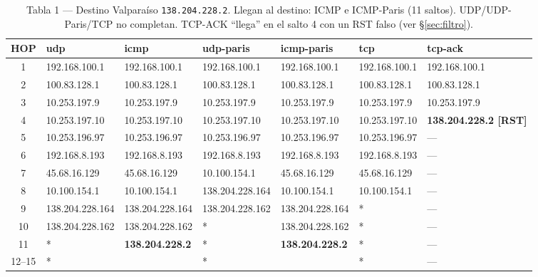 \documentclass[11pt,a4paper]{article}
\newcommand{\ip}[1]{\texttt{#1}}
\begin{document}
\begin{landscape}
\begin{table}[H]
\centering\scriptsize
\begin{tabular}{c|llllll}
\toprule
HOP & udp & icmp & udp-paris & icmp-paris & tcp & tcp-ack \\
\midrule
1 & 192.168.100.1 & 192.168.100.1 & 192.168.100.1 & 192.168.100.1 & 192.168.100.1 & 192.168.100.1 \\
2 & 100.83.128.1 & 100.83.128.1 & 100.83.128.1 & 100.83.128.1 & 100.83.128.1 & 100.83.128.1 \\
3 & 10.253.197.9 & 10.253.197.9 & 10.253.197.9 & 10.253.197.9 & 10.253.197.9 & 10.253.197.9 \\
4 & 10.253.197.10 & 10.253.197.10 & 10.253.197.10 & 10.253.197.10 & 10.253.197.10 & \textbf{138.204.228.2 [RST]} \\
5 & 10.253.196.97 & 10.253.196.97 & 10.253.196.97 & 10.253.196.97 & 10.253.196.97 & --- \\
6 & 192.168.8.193 & 192.168.8.193 & 192.168.8.193 & 192.168.8.193 & 192.168.8.193 & --- \\
7 & 45.68.16.129 & 45.68.16.129 & 10.100.154.1 & 45.68.16.129 & 45.68.16.129 & --- \\
8 & 10.100.154.1 & 10.100.154.1 & 138.204.228.164 & 10.100.154.1 & 10.100.154.1 & --- \\
9 & 138.204.228.164 & 138.204.228.164 & 138.204.228.162 & 138.204.228.164 & * & --- \\
10 & 138.204.228.162 & 138.204.228.162 & * & 138.204.228.162 & * & --- \\
11 & * & \textbf{138.204.228.2} & * & \textbf{138.204.228.2} & * & --- \\
12--15 & * & & * & & * & --- \\
\bottomrule
\end{tabular}
\caption{Tabla 1 --- Destino Valparaíso \ip{138.204.228.2}. Llegan al destino: ICMP e ICMP-Paris
(11 saltos). UDP/UDP-Paris/TCP no completan. TCP-ACK ``llega'' en el salto 4 con un RST falso
(ver §\ref{sec:filtro}).}
\end{table}


\end{landscape}
\end{document}
